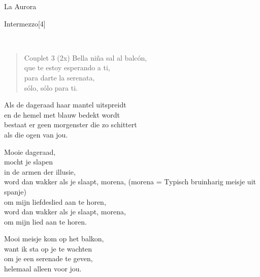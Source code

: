 \begin{song}[vals]{La Aurora}
\begin{instrumental}{Intermezzo}[4]
   
\end{instrumental}\\
\begin{verse}{Couplet 3 (2x)}
Bella niña sal al balcón,\\
que te estoy esperando a ti,\\
para darte la serenata,\\
sólo, sólo para ti. \hspace{1em}\hspace{2em}\\
\end{verse}
\end{song}

\clearpage

\begin{translation}
Als de dageraad haar mantel uitspreidt\\
en de hemel met blauw bedekt wordt\\
bestaat er geen morgenster die zo schittert\\
als die ogen van jou.\vspace{\wlskip}

Mooie dageraad,\\
mocht je slapen\\
in de armen der illusie,\\
word dan wakker als je slaapt, morena, (morena = Typisch bruinharig meisje uit spanje)\\
om mijn liefdeslied aan te horen,\\
word dan wakker als je slaapt, morena,\\
om mijn lied aan te horen.\vspace{\wlskip}

Mooi meisje kom op het balkon,\\
want ik sta op je te wachten\\
om je een serenade te geven,\\
helemaal alleen voor jou.\\
\end{translation}
